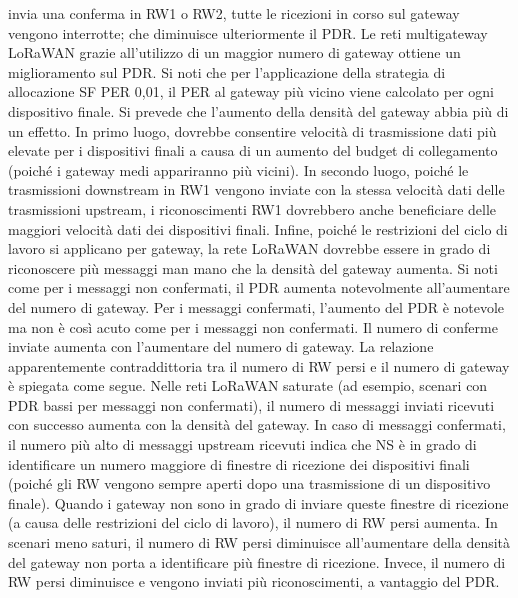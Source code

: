 \documentclass[a4paper]{report} %
\begin{document}
invia una conferma in RW1 o RW2, tutte le ricezioni in corso sul gateway vengono interrotte; che diminuisce ulteriormente il PDR. 
Le reti multigateway LoRaWAN grazie all'utilizzo di un maggior numero di gateway ottiene un miglioramento sul PDR. Si noti che per l'applicazione della strategia di allocazione SF PER 0,01, il PER al gateway più vicino viene calcolato per ogni dispositivo finale. Si prevede che l'aumento della densità del gateway abbia più di un effetto. In primo luogo, dovrebbe consentire velocità di trasmissione dati più elevate per i dispositivi finali a causa di un aumento del budget di collegamento (poiché i gateway medi appariranno più vicini). In secondo luogo, poiché le trasmissioni downstream in RW1 vengono inviate con la stessa velocità dati delle trasmissioni upstream, i riconoscimenti RW1 dovrebbero anche beneficiare delle maggiori velocità dati dei dispositivi finali. Infine, poiché le restrizioni del ciclo di lavoro si applicano per gateway, la rete LoRaWAN dovrebbe essere in grado di riconoscere più messaggi man mano che la densità del gateway aumenta. Si noti come per i messaggi non confermati, il PDR aumenta notevolmente all'aumentare del numero di gateway. Per i messaggi confermati, l'aumento del PDR è notevole ma non è così acuto come per i messaggi non confermati. Il numero di conferme inviate aumenta con l'aumentare del numero di gateway. La relazione apparentemente contraddittoria tra il numero di RW persi e il numero di gateway è spiegata come segue. Nelle reti LoRaWAN saturate (ad esempio, scenari con PDR bassi per messaggi non confermati), il numero di messaggi inviati ricevuti con successo aumenta con la densità del gateway. In caso di messaggi confermati, il numero più alto di messaggi upstream ricevuti indica che NS è in grado di identificare un numero maggiore di finestre di ricezione dei dispositivi finali (poiché gli RW vengono sempre aperti dopo una trasmissione di un dispositivo finale). Quando i gateway non sono in grado di inviare queste finestre di ricezione (a causa delle restrizioni del ciclo di lavoro), il numero di RW persi aumenta. In scenari meno saturi, il numero di RW persi diminuisce all'aumentare della densità del gateway non porta a identificare più finestre di ricezione. Invece, il numero di RW persi diminuisce e vengono inviati più riconoscimenti, a vantaggio del PDR.
\end{document}
